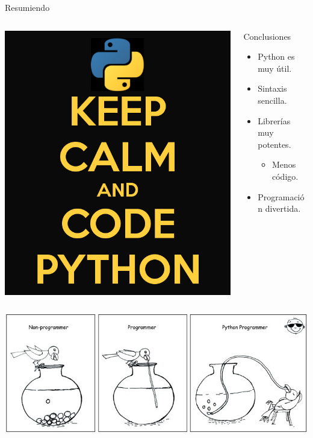 \documentclass[bigger,unknownkeysallowed]{beamer}
\begin{document}
\begin{frame}[label={sec:orgee9da74}]{Resumiendo}
\begin{columns}
\begin{column}{0.5\columnwidth}
\begin{center}
\begin{center}
\includegraphics[width=.7\textwidth]{thanks.png}
\end{center}
\end{center}
\end{column}


\begin{column}{0.5\columnwidth}
\begin{block}{Conclusiones}
\begin{itemize}
\item Python es muy útil.

\item Sintaxis sencilla.

\item Librerías muy potentes.
\begin{itemize}
\item Menos código.
\end{itemize}

\item Programación divertida.
\end{itemize}
\end{block}
\end{column}
\end{columns}

\begin{center}
\begin{center}
\includegraphics[width=.7\textwidth]{pythonuser.jpg}
\end{center}
\end{center}
\end{frame}
\end{document}
